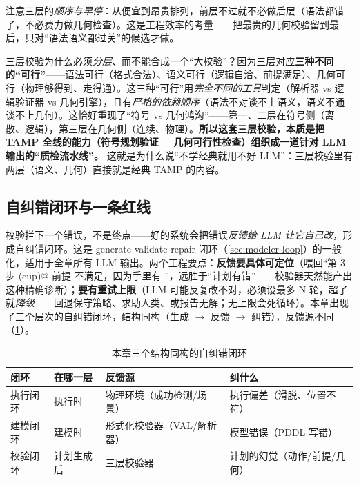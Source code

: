 \noindent 注意三层的\emph{顺序与早停}：从便宜到昂贵排列，前层不过就不必做后层（语法都错了，不必费力做几何检查）。这是工程效率的考量——把最贵的几何校验留到最后，只对“语法语义都过关”的候选才做。

\begin{insight}
三层校验为什么必须\emph{分层}、而不能合成一个“大校验”？因为三层对应\textbf{三种不同的“可行”}——语法可行（格式合法）、语义可行（逻辑自洽、前提满足）、几何可行（物理够得到、走得通）。这三种“可行”用\emph{完全不同的工具}判定（解析器 vs 逻辑验证器 vs 几何引擎），且有\emph{严格的依赖顺序}（语法不对谈不上语义，语义不通谈不上几何）。这恰好重现了“符号 vs 几何鸿沟”——第一、二层在符号侧（离散、逻辑），第三层在几何侧（连续、物理）。\textbf{所以这套三层校验，本质是把 TAMP 全线的能力（符号规划验证 $+$ 几何可行性检查）组织成一道针对 LLM 输出的“质检流水线”。} 这就是为什么说“不学经典就用不好 LLM”：三层校验里有两层（语义、几何）直接就是经典 TAMP 的内容。
\end{insight}

\subsection{自纠错闭环与一条红线}
\label{sec:verify-redline}

校验拦下一个错误，不是终点——好的系统会把错误\emph{反馈给 LLM 让它自己改}，形成自纠错闭环。这是 generate-validate-repair 闭环（\cref{sec:modeler-loop}）的一般化，适用于全章所有 LLM 输出。两个工程要点：\textbf{反馈要具体可定位}（喂回“第 3 步 \verb@pick(cup)@ 前提 \verb@handempty@ 不满足，因为手里有 \verb@book@”，远胜于“计划有错”——校验器天然能产出这种精确诊断）；\textbf{要有重试上限}（LLM 可能反复改不对，必须设最多 N 轮，超了就\emph{降级}——回退保守策略、求助人类、或报告无解；无上限会死循环）。本章出现了三个层次的自纠错闭环，结构同构（生成 $\to$ 反馈 $\to$ 纠错），反馈源不同（\cref{tab:three-loops}）。

\begin{table}[H]\centering\small
\caption{本章三个结构同构的自纠错闭环}
\label{tab:three-loops}
\begin{tabular}{p{2.4cm}p{2.0cm}p{3.6cm}p{3.6cm}}
\toprule
闭环 & 在哪一层 & 反馈源 & 纠什么 \\
\midrule
执行闭环 & 执行时 & 物理环境（成功检测/场景） & 执行偏差（滑脱、位置不符） \\
建模闭环 & 建模时 & 形式化校验器（VAL/解析器） & 模型错误（PDDL 写错） \\
校验闭环 & 计划生成后 & 三层校验器 & 计划的幻觉（动作/前提/几何） \\
\bottomrule
\end{tabular}
\end{table}


